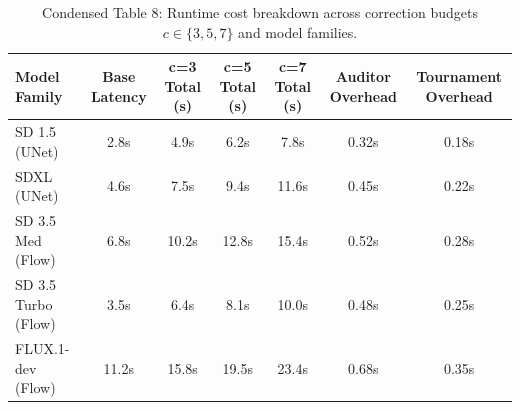 \begin{table}
\caption{Condensed Table 8: Runtime cost breakdown across correction budgets $c \in \{3, 5, 7\}$ and model families.}
\label{tab:table8_condensed}
\begin{tabular}{lcccccc}
\toprule
Model Family & Base Latency & c=3 Total (s) & c=5 Total (s) & c=7 Total (s) & Auditor Overhead & Tournament Overhead \\
\midrule
SD 1.5 (UNet) & 2.8s & 4.9s & 6.2s & 7.8s & 0.32s & 0.18s \\
SDXL (UNet) & 4.6s & 7.5s & 9.4s & 11.6s & 0.45s & 0.22s \\
SD 3.5 Med (Flow) & 6.8s & 10.2s & 12.8s & 15.4s & 0.52s & 0.28s \\
SD 3.5 Turbo (Flow) & 3.5s & 6.4s & 8.1s & 10.0s & 0.48s & 0.25s \\
FLUX.1-dev (Flow) & 11.2s & 15.8s & 19.5s & 23.4s & 0.68s & 0.35s \\
\bottomrule
\end{tabular}
\end{table}

